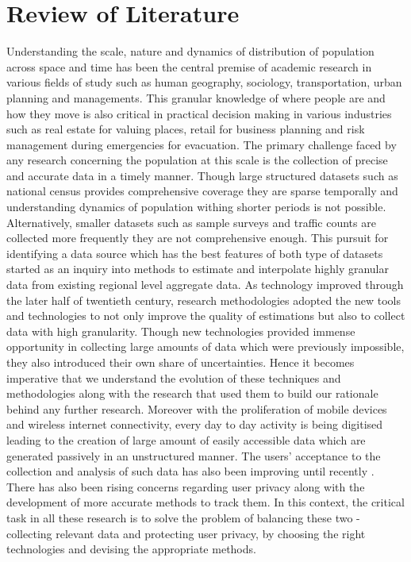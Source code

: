 \chapter{Review of Literature}\label{chapter:literature}

Understanding the scale, nature and dynamics of distribution of population across space and time has been the central premise of academic research in various fields of study such as human geography, sociology, transportation, urban planning and managements.
This granular knowledge of where people are and how they move is also critical in practical decision making in various industries such as real estate for valuing places, retail for business planning and risk management during emergencies for evacuation.
The primary challenge faced by any research concerning the population at this scale is the collection of precise and accurate data in a timely manner.
Though large structured datasets such as national census provides comprehensive coverage they are sparse temporally and understanding dynamics of population withing shorter periods is not possible.
Alternatively, smaller datasets such as sample surveys and traffic counts are collected more frequently they are not comprehensive enough. 
This pursuit for identifying a data source which has the best features of both type of datasets started as an inquiry into methods to estimate and interpolate highly granular data from existing regional level aggregate data.
As technology improved through the later half of twentieth century, research methodologies adopted the new tools and technologies to not only improve the quality of estimations but also to collect data with high granularity.
Though new technologies provided immense opportunity in collecting large amounts of data which were previously impossible, they also introduced their own share of uncertainties.
Hence it becomes imperative that we understand the evolution of these techniques and methodologies along with the research that used them to build our rationale behind any further research.
Moreover with the proliferation of mobile devices and wireless internet connectivity, every day to day activity is being digitised leading to the creation of large amount of easily accessible data which are generated passively in an unstructured manner.
The users' acceptance to the collection and analysis of such data has also been improving until recently \cite[-2cm]{kobsa2014}.
There has also been rising concerns regarding user privacy along with the development of more accurate methods to track them.
In this context, the critical task in all these research is to solve the problem of balancing these two - collecting relevant data and protecting user privacy, by choosing the right technologies and devising the appropriate methods.

